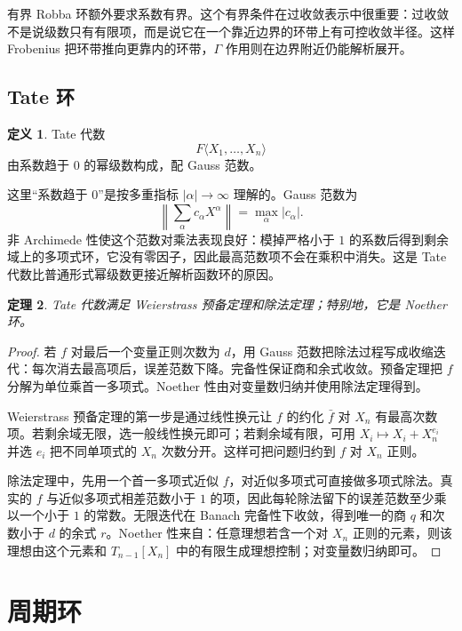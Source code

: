 \documentclass[11pt,a4paper,openany]{ctexbook}
\numberwithin{equation}{chapter}
\theoremstyle{plain}
\newtheorem{theorem}{定理}[chapter]
\theoremstyle{definition}
\newtheorem{definition}[theorem]{定义}
\theoremstyle{remark}
\begin{document}
有界 Robba 环额外要求系数有界。这个有界条件在过收敛表示中很重要：过收敛不是说级数只有有限项，而是说它在一个靠近边界的环带上有可控收敛半径。这样 Frobenius 把环带推向更靠内的环带，$\Gamma$ 作用则在边界附近仍能解析展开。

\subsection{Tate 环}

\begin{definition}
Tate 代数
\[
  F\langle X_1,\ldots,X_n\rangle
\]
由系数趋于 $0$ 的幂级数构成，配 Gauss 范数。
\end{definition}

这里“系数趋于 $0$”是按多重指标 $|\alpha|\to\infty$ 理解的。Gauss 范数为
\[
  \left\|\sum_\alpha c_\alpha X^\alpha\right\|=\max_\alpha |c_\alpha|.
\]
非 Archimede 性使这个范数对乘法表现良好：模掉严格小于 $1$ 的系数后得到剩余域上的多项式环，它没有零因子，因此最高范数项不会在乘积中消失。这是 Tate 代数比普通形式幂级数更接近解析函数环的原因。

\begin{theorem}
Tate 代数满足 Weierstrass 预备定理和除法定理；特别地，它是 Noether 环。
\end{theorem}

\begin{proof}
若 $f$ 对最后一个变量正则次数为 $d$，用 Gauss 范数把除法过程写成收缩迭代：每次消去最高项后，误差范数下降。完备性保证商和余式收敛。预备定理把 $f$ 分解为单位乘首一多项式。Noether 性由对变量数归纳并使用除法定理得到。

Weierstrass 预备定理的第一步是通过线性换元让 $f$ 的约化 $\bar f$ 对 $X_n$ 有最高次数项。若剩余域无限，选一般线性换元即可；若剩余域有限，可用 $X_i\mapsto X_i+X_n^{e_i}$ 并选 $e_i$ 把不同单项式的 $X_n$ 次数分开。这样可把问题归约到 $f$ 对 $X_n$ 正则。

除法定理中，先用一个首一多项式近似 $f$，对近似多项式可直接做多项式除法。真实的 $f$ 与近似多项式相差范数小于 $1$ 的项，因此每轮除法留下的误差范数至少乘以一个小于 $1$ 的常数。无限迭代在 Banach 完备性下收敛，得到唯一的商 $q$ 和次数小于 $d$ 的余式 $r$。Noether 性来自：任意理想若含一个对 $X_n$ 正则的元素，则该理想由这个元素和 $T_{n-1}[X_n]$ 中的有限生成理想控制；对变量数归纳即可。
\end{proof}

\section{周期环}
\end{document}
